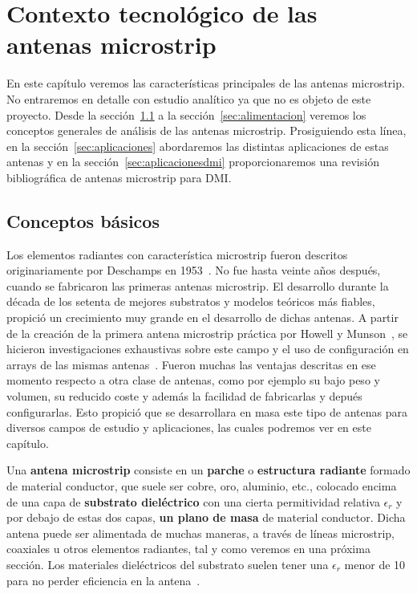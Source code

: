 \chapter{\textbf{Contexto tecnológico de las antenas microstrip}}\label{ch:contexto}

En este capítulo veremos las características principales de las antenas microstrip. No entraremos en detalle con estudio analítico ya que no es objeto de este proyecto. Desde la sección~\ref{sec:conceptos} a la sección~\ref{sec:alimentacion} veremos los conceptos generales de análisis de las antenas microstrip. Prosiguiendo esta línea, en la sección~\ref{sec:aplicaciones} abordaremos las distintas aplicaciones de estas antenas y en la sección~\ref{sec:aplicacionesdmi} proporcionaremos una revisión bibliográfica de antenas microstrip para DMI.


\section{Conceptos básicos}\label{sec:conceptos}

Los elementos radiantes con característica microstrip fueron descritos originariamente por Deschamps en 1953~\cite{deschamps}. No fue hasta veinte años después, cuando se fabricaron las primeras antenas microstrip. El desarrollo durante la década de los setenta de mejores substratos y modelos teóricos más fiables, propició un crecimiento muy grande en el desarrollo de dichas antenas. A partir de la creación de la primera antena microstrip práctica por Howell y Munson~\cite{howell,munson}, se hicieron investigaciones exhaustivas sobre este campo y el uso de configuración en arrays de las mismas antenas~\cite{bahl,james1,james2}. Fueron muchas las ventajas descritas en ese momento respecto a otra clase de antenas, como por ejemplo su bajo peso y volumen, su reducido coste y además la facilidad de fabricarlas y depués configurarlas. Esto propició que se desarrollara en masa este tipo de antenas para diversos campos de estudio y aplicaciones, las cuales podremos ver en este capítulo.

Una \textbf{antena microstrip} consiste en un \textbf{parche} o \textbf{estructura radiante} formado de material conductor, que suele ser cobre, oro, aluminio, etc., colocado encima de una capa de \textbf{substrato dieléctrico} con una cierta permitividad relativa $\epsilon_{r}$ y por debajo de estas dos capas, \textbf{un plano de masa} de material conductor. Dicha antena puede ser alimentada de muchas maneras, a través de líneas microstrip, coaxiales u otros elementos radiantes, tal y como veremos en una próxima sección. Los materiales dieléctricos del substrato suelen tener una $\epsilon_{r}$ menor de 10 para no perder eficiencia en la antena~\cite{garg}.

